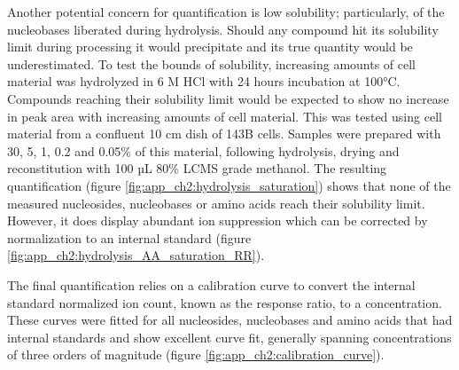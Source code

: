Another potential concern for quantification is low solubility; particularly, of the nucleobases liberated during hydrolysis.
Should any compound hit its solubility limit during processing it would precipitate and its true quantity would be underestimated.
To test the bounds of solubility, increasing amounts of cell material was hydrolyzed in 6 M HCl with 24 hours incubation at 100°C.
Compounds reaching their solubility limit would be expected to show no increase in peak area with increasing amounts of cell material.
This was tested using cell material from a confluent 10 cm dish of 143B cells.
Samples were prepared with 30, 5, 1, 0.2 and 0.05\% of this material, following hydrolysis, drying and reconstitution with 100 µL 80\% LCMS grade methanol.
The resulting quantification (figure \ref{fig:app_ch2:hydrolysis_saturation}) shows that none of the measured nucleosides, nucleobases or amino acids reach their solubility limit.
However, it does display abundant ion suppression which can be corrected by normalization to an internal standard (figure \ref{fig:app_ch2:hydrolysis_AA_saturation_RR}).

The final quantification relies on a calibration curve to convert the internal standard normalized ion count, known as the response ratio, to a concentration.
These curves were fitted for all nucleosides, nucleobases and amino acids that had internal standards and show excellent curve fit, generally spanning concentrations of three orders of magnitude (figure \ref{fig:app_ch2:calibration_curve}).

